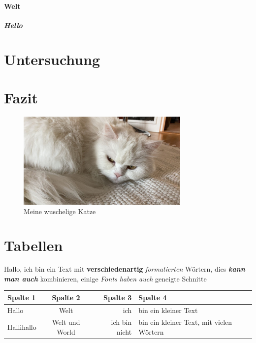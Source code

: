 \documentclass[12pt,parskip=half]{scrartcl}
\begin{document}
\paragraph{Welt} \blindtext[5]

\subparagraph{Hello} \blindtext[5]


\section{Untersuchung}

\blindtext[5] 



\section{Fazit}\label{sec:fazit}

\begin{figure}
\centering
\includegraphics[width=0.75\textwidth,angle=45]{Bilder/miau}
\caption{Meine wuschelige Katze}\label{fig:miau}
\end{figure}


\blindtext[5]

\section{Tabellen}

Hallo, ich bin ein Text mit \textbf{verschiedenartig} \textit{formatierten}    Wörtern, dies \textbf{\textit{kann man auch}} kombinieren, einige \textsl{Fonts haben auch} geneigte Schnitte

\clearpage

\begin{tabular}{|l|c|r|p{5cm}|} \hline
\textbf{Spalte 1} & \textbf{Spalte 2} & \textbf{Spalte  3} & \textbf{Spalte  4} \\ \hline \hline
Hallo & Welt & ich & bin ein kleiner Text \\ \hline 
Hallihallo & Welt und World & ich bin nicht & bin ein kleiner Text, mit vielen Wörtern \\ \hline
\end{tabular}\vspace*{1cm}
\end{document}
